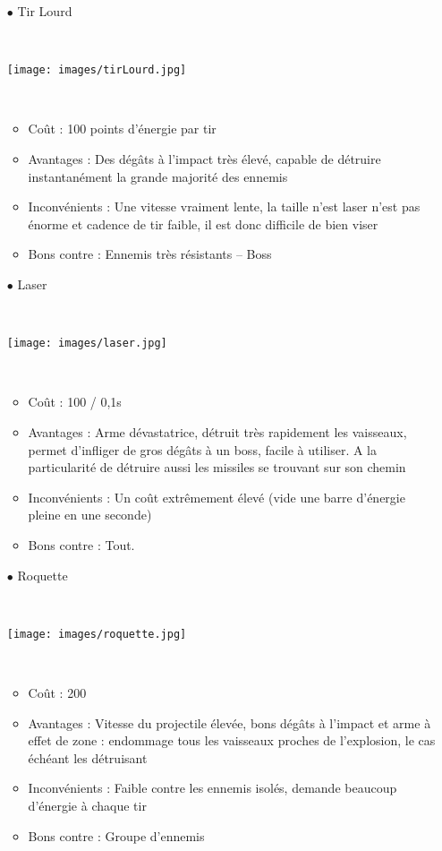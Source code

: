 \documentclass[12pt,a4paper]{article}
\begin{document}
\begin{itemize}

\item[$\bullet$ Tir Lourd]
	\par~	
	\vspace{0.5cm}
	\par \texttt{[image: images/tirLourd.jpg]}
	\par~
	\begin{itemize}
		\item Coût : 100 points d'énergie par tir
		\item Avantages : Des dégâts à l'impact très élevé, capable de détruire instantanément la grande majorité des ennemis
		\item Inconvénients : Une vitesse vraiment lente, la taille n'est laser n'est pas énorme et cadence de tir faible, il est donc difficile de bien viser
		\item Bons contre : Ennemis très résistants – Boss
	\end{itemize}

\item[$\bullet$ Laser]
	\par~
	\vspace{0.5cm}
	\par \texttt{[image: images/laser.jpg]}
	\par~
	\begin{itemize}
		\item Coût : 100 / 0,1s
		\item Avantages : Arme dévastatrice, détruit très rapidement les vaisseaux, permet d'infliger de gros dégâts à un boss, facile à utiliser. A la particularité de détruire aussi les missiles se trouvant sur son chemin
		\item Inconvénients : Un coût extrêmement élevé (vide une barre d'énergie pleine en une seconde)
		\item Bons contre : Tout.
	\end{itemize}


\item[$\bullet$ Roquette]
	\par~
	\vspace{0.5cm}
	\par \texttt{[image: images/roquette.jpg]}
	\par~
	\begin{itemize}
	\item Coût : 200
	\item Avantages : Vitesse du projectile élevée, bons dégâts à l'impact et arme à effet de zone : endommage tous les vaisseaux proches de l'explosion, le cas échéant les détruisant
	\item Inconvénients : Faible contre les ennemis isolés, demande beaucoup d'énergie à chaque tir
	\item Bons contre : Groupe d'ennemis
	\end{itemize}

\end{itemize}
\end{document}
